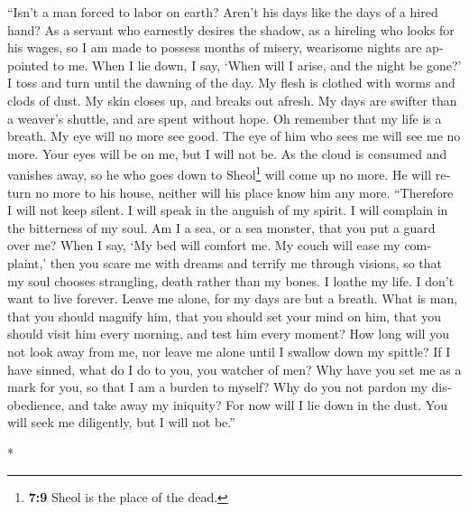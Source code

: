 \begin{paracol}{2}
\begin{otherlanguage}{english}
 ``Isn't a man forced to labor on earth? Aren't his days
like the days of a hired hand?  As a servant who earnestly
desires the shadow, as a hireling who looks for his wages,
 so I am made to possess months of misery, wearisome
nights are appointed to me.  When I lie down, I say, `When
will I arise, and the night be gone?' I toss and turn until the dawning
of the day.  My flesh is clothed with worms and clods of
dust. My skin closes up, and breaks out afresh.  My days
are swifter than a weaver's shuttle, and are spent without hope.
 Oh remember that my life is a breath. My eye will no more
see good.  The eye of him who sees me will see me no more.
Your eyes will be on me, but I will not be.  As the cloud
is consumed and vanishes away, so he who goes down to Sheol\footnote{\textbf{7:9}
  Sheol is the place of the dead.} will come up no more. 
He will return no more to his house, neither will his place know him any
more.  ``Therefore I will not keep silent. I will speak
in the anguish of my spirit. I will complain in the bitterness of my
soul.  Am I a sea, or a sea monster, that you put a guard
over me?  When I say, `My bed will comfort me. My couch
will ease my complaint,'  then you scare me with dreams
and terrify me through visions,  so that my soul chooses
strangling, death rather than my bones.  I loathe my
life. I don't want to live forever. Leave me alone, for my days are but
a breath.  What is man, that you should magnify him, that
you should set your mind on him,  that you should visit
him every morning, and test him every moment?  How long
will you not look away from me, nor leave me alone until I swallow down
my spittle?  If I have sinned, what do I do to you, you
watcher of men? Why have you set me as a mark for you, so that I am a
burden to myself?  Why do you not pardon my disobedience,
and take away my iniquity? For now will I lie down in the dust. You will
seek me diligently, but I will not be.''

\end{otherlanguage}

\switchcolumn[0]*

\hypertarget{fuerte-uxe9nfasis-en-la-justicia-de-dios-que-se-ha-demostrado-que-es-un-juicio-contra-los-hijos-de-job-y-resultaruxe1-ser-bueno-para-job-si-busca-a-dios-con-sinceridad}{%
}
\end{paracol}
